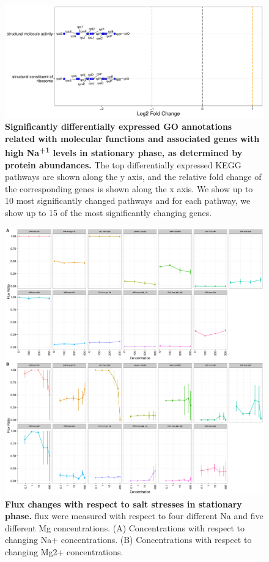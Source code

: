 \documentclass[a4paper]{article}
\begin{document}
\clearpage
\begin{figure}
	\includegraphics[width=1.0\textwidth]{../../d_figures/mf_n_05.pdf}
	\caption[Significantly altered GO annotations associated with molecular functions for protein samples in stationary phase tested for high Na\textsuperscript{+1} against base Na\textsuperscript{+1}]
	{\textbf{Significantly differentially expressed GO annotations related with molecular functions and associated genes with high Na\textsuperscript{+1} levels in stationary phase, as determined by protein abundances.} The top differentially expressed KEGG pathways are shown along the y axis, and the relative fold change of the corresponding genes is shown along the x axis. We show up to 10 most significantly changed pathways and for each pathway, we show up to 15 of the most significantly changing genes.}
\end{figure}

\clearpage
\begin{figure}[!htb]
	\includegraphics[width=1\textwidth]{../supplementary_figures/figS2_FluxSta.pdf}
	\caption[Flux Stationary]
	{\textbf{Flux changes with respect to salt stresses in stationary phase.} flux were measured with respect to four different Na and five different Mg concentrations. (A) Concentrations with respect to changing Na+ concentrations. (B) Concentrations with respect to changing Mg2+ concentrations.}
\end{figure}
\end{document}
